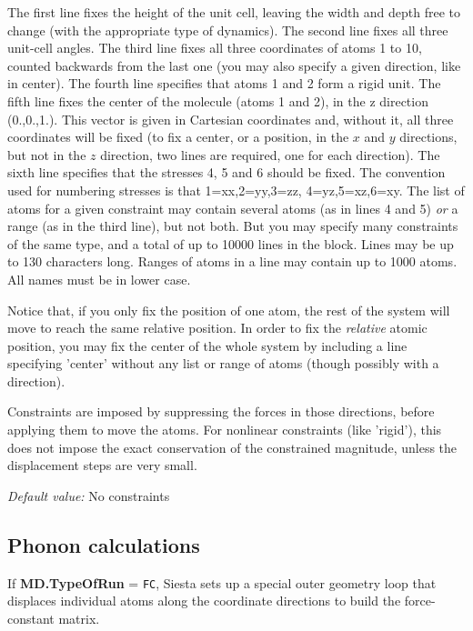 \documentclass[11pt]{article}
\begin{document}
\begin{description}
The first line fixes the height of the unit cell, leaving the width
and depth free to change (with the appropriate type of dynamics).  The
second line fixes all three unit-cell angles.  The third line fixes
all three coordinates of atoms 1 to 10, counted backwards from the
last one (you may also specify a given direction, like in center).
The fourth line specifies that atoms 1 and 2 form a rigid unit.  The
fifth line fixes the center of the molecule (atoms 1 and 2), in the z
direction (0.,0.,1.). This vector is given in Cartesian coordinates
and, without it, all three coordinates will be fixed (to fix a center,
or a position, in the $x$ and $y$ directions, but not in the $z$
direction, two lines are required, one for each direction).  The sixth
line specifies that the stresses 4, 5 and 6 should be fixed.  The
convention used for numbering stresses is that 1=xx,2=yy,3=zz,
4=yz,5=xz,6=xy.  The list of atoms for a given constraint may contain
several atoms (as in lines 4 and 5) {\it or} a range (as in the third
line), but not both. But you may specify many constraints of the same
type, and a total of up to 10000 lines in the block.  Lines may be up
to 130 characters long. Ranges of atoms in a line may contain up to
1000 atoms. All names must be in lower case.

Notice that, if you only fix the position of one atom, the rest of the
system will move to reach the same relative position. In order to
fix the {\it relative} atomic position, you may fix the center of
the whole system by including a line specifying 'center'
without any list or range of atoms (though possibly with a direction).

Constraints are imposed by suppressing the forces in those directions,
before applying them to move the atoms. For nonlinear constraints
(like 'rigid'), this does not impose the exact conservation of the
constrained magnitude, unless the displacement steps are very small.

{\it Default value:} No constraints

\end{description}

\subsection{Phonon calculations}

If {\bf MD.TypeOfRun} = {\tt FC}, {\sc Siesta} sets up a special
outer geometry loop that displaces individual atoms along the
coordinate directions to build the force-constant matrix.
\end{document}
